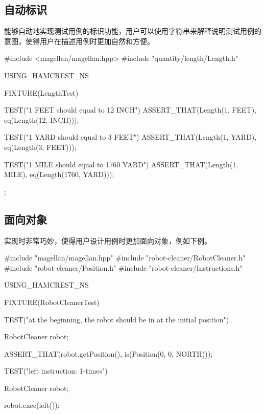 \begin{content}

\subsection{自动标识}

能够自动地实现测试用例的标识功能，用户可以使用字符串来解释说明测试用例的意图，使得用户在描述用例时更加自然和方便。

\begin{leftbar}
\begin{c++}[caption={test/quantity/LengthTest.cpp}]
#include <magellan/magellan.hpp>
#include "quantity/length/Length.h"

USING_HAMCREST_NS

FIXTURE(LengthTest)
{
    TEST("1 FEET should equal to 12 INCH")
    {
        ASSERT_THAT(Length(1, FEET), eq(Length(12, INCH)));
    }

    TEST("1 YARD should equal to 3 FEET")
    {
        ASSERT_THAT(Length(1, YARD), eq(Length(3, FEET)));
    }

    TEST("1 MILE should equal to 1760 YARD")
    {
        ASSERT_THAT(Length(1, MILE), eq(Length(1760, YARD)));
    }
};
\end{c++}
\end{leftbar}

\subsection{面向对象}

实现时非常巧妙，使得用户设计用例时更加面向对象，例如下例。

\begin{leftbar}
\begin{c++}[caption={test/robot-cleaner/RobotCleanerTest.cpp}]
#include "magellan/magellan.hpp"
#include "robot-cleaner/RobotCleaner.h"
#include "robot-cleaner/Position.h"
#include "robot-cleaner/Instructions.h"

USING_HAMCREST_NS

FIXTURE(RobotCleanerTest)
{
    TEST("at the beginning, the robot should be in at the initial position")
    {
        RobotCleaner robot;

        ASSERT_THAT(robot.getPosition(), is(Position(0, 0, NORTH)));
    }

    TEST("left instruction: 1-times")
    {
        RobotCleaner robot;

        robot.exec(left());
        
}}
\end{c++}
\end{leftbar}
\end{content}

